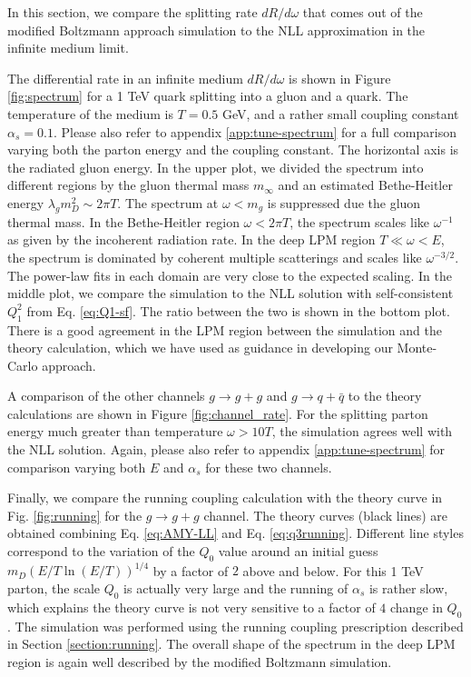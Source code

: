 \documentclass[aps, prc, reprint, amsmath, groupedaddress, nofootinbib]{revtex4-1}
\begin{document}
In this section, we compare the splitting rate $dR/d\omega$ that comes out of the modified Boltzmann approach simulation to the NLL approximation in the infinite medium limit.

The differential rate in an infinite medium $dR/d\omega$ is shown in Figure \ref{fig:spectrum} for a 1 TeV quark splitting into a gluon and a quark.
The temperature of the medium is $T=0.5$ GeV, and a rather small coupling constant $\alpha_s = 0.1$.
Please also refer to appendix \ref{app:tune-spectrum} for a full comparison varying both the parton energy and the coupling constant.
The horizontal axis is the radiated gluon energy.
In the upper plot, we divided the spectrum into different regions by the gluon thermal mass $m_\infty$ and an estimated Bethe-Heitler energy $\lambda_g m_D^2 \sim 2\pi T$.
The spectrum at $\omega < m_g$ is suppressed due the gluon thermal mass.
In the Bethe-Heitler region $\omega < 2\pi T$, the spectrum scales like $\omega^{-1}$ as given by the incoherent radiation rate.
In the deep LPM region $T \ll \omega < E$, the spectrum is dominated by coherent multiple scatterings and scales like $\omega^{-3/2}$.
The power-law fits in each domain are very close to the expected scaling.
In the middle plot, we compare the simulation to the NLL solution with self-consistent $Q_1^2$ from Eq. \ref{eq:Q1-sf}. 
The ratio between the two is shown in the bottom plot.
There is a good agreement in the LPM region between the simulation and the theory calculation, which we have used as guidance in developing our Monte-Carlo approach.

A comparison of the other channels $g\rightarrow g+g$ and $g\rightarrow q+\bar{q}$ to the theory calculations are shown in Figure \ref{fig:channel_rate}.
For the splitting parton energy much greater than temperature $\omega > 10 T$, the simulation agrees well with the NLL solution. 
Again, please also refer to appendix \ref{app:tune-spectrum} for comparison varying both $E$ and $\alpha_s$ for these two channels.


Finally, we compare the running coupling calculation with the theory curve in Fig. \ref{fig:running} for the $g\rightarrow g+g$ channel.
The theory curves (black lines) are obtained combining Eq. \ref{eq:AMY-LL} and Eq. \ref{eq:q3running}.
Different line styles correspond to the variation of the $Q_0$ value around an initial guess $m_D (E/T \ln(E/T) )^{1/4}$ by a factor of $2$ above and below.
For this 1 TeV parton, the scale $Q_0$ is actually very large and the running of $\alpha_s$ is rather slow, which explains the theory curve is not very sensitive to a factor of $4$ change in $Q_0$.
The simulation was performed using the running coupling prescription described in Section \ref{section:running}.
The overall shape of the spectrum in the deep LPM region is again well described by the modified Boltzmann simulation. 
\end{document}
